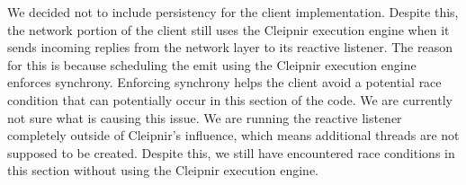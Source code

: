 We decided not to include persistency for the client implementation. Despite this, the network portion of the client still uses the Cleipnir execution engine when it sends incoming replies from the network layer to its reactive listener. The reason for this is because scheduling the emit using the Cleipnir execution engine enforces synchrony. Enforcing synchrony helps the client avoid a potential race condition that can potentially occur in this section of the code. We are currently not sure what is causing this issue. We are running the reactive listener completely outside of Cleipnir’s influence, which means additional threads are not supposed to be created. Despite this, we still have encountered race conditions in this section without using the Cleipnir execution engine.
